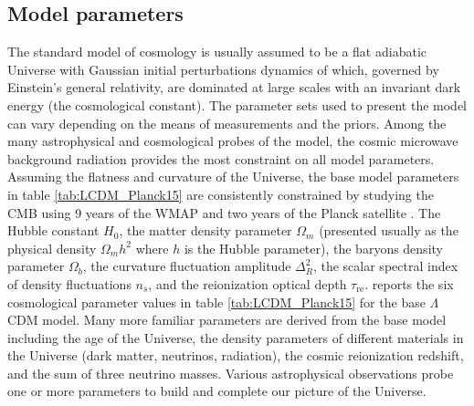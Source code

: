 \documentclass[paper=a4, fontsize=11pt]{scrartcl} %
\numberwithin{equation}{section} %
\numberwithin{figure}{section} %
\numberwithin{table}{section} %
\begin{document}

\subsection{Model parameters}
\label{subsec:Model_parameters}
The standard model of cosmology is usually assumed to be a flat adiabatic Universe with Gaussian initial perturbations dynamics of which, governed by Einstein's general relativity, are dominated at large scales with an invariant dark energy (the cosmological constant). The parameter sets used to present the model can vary depending on the means of measurements and the priors. Among the many astrophysical and cosmological probes of the model, the cosmic microwave background radiation provides the most constraint on all model parameters. Assuming the flatness and curvature of the Universe, the base model parameters in table \ref{tab:LCDM_Planck15} are consistently constrained by studying the CMB using 9 years of the WMAP \citep[][]{WMAP9} and two years of the Planck satellite \citep[][]{Planck2015}. The Hubble constant $H_0$, the matter density parameter $\Omega_m$ (presented usually as the physical density $\Omega_m h^2$ where $h$ is the Hubble parameter), the baryons density parameter $\Omega_b$, the curvature fluctuation amplitude $\Delta^2_R$, the scalar spectral index of density fluctuations $n_s$, and the reionization optical depth $\tau_\mathrm{re}$. \citet[][]{Planck2015} reports the six cosmological parameter values in table \ref{tab:LCDM_Planck15} for the base $\Lambda$CDM model. Many more familiar parameters are derived from the base model including the age of the Universe, the density parameters of different materials in the Universe (dark matter, neutrinos, radiation), the cosmic reionization redshift, and the sum of three neutrino masses. Various astrophysical observations probe one or more parameters to build and complete our picture of the Universe.
\end{document}
